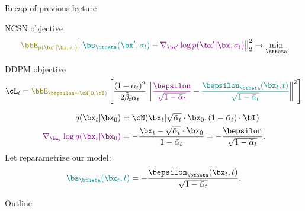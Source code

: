 \begin{frame}{Recap of previous lecture}
	\begin{block}{NCSN objective}
		\vspace{-0.2cm}
		\[
			{\color{olive}\bbE_{p(\bx' | \bx, \sigma_l)}}\bigl\| {\color{teal}\bs_{\btheta}(\bx', \sigma_l)} - {\color{violet}\nabla_{\bx'} \log p(\bx' | \bx, \sigma_l)} \bigr\|^2_2 \rightarrow \min_{\btheta}
		\]
	\end{block}
	\vspace{-0.3cm}
	\begin{block}{DDPM objective}
		\vspace{-0.2cm}
		\[
			\cL_t = {\color{olive}\bbE_{\bepsilon \sim \cN(0, \bI)}} \left[ \frac{(1 - \alpha_t)^2}{2\tilde{\beta}_t \alpha_t} \left\| {\color{violet}\frac{\bepsilon}{\sqrt{1 - \bar{\alpha}_t}}} - {\color{teal}\frac{\bepsilon_{\btheta}(\bx_t, t)}{\sqrt{1 - \bar{\alpha}_t}}}\right\|^2 \right]
		\]
		\vspace{-0.7cm}
	\end{block}
	\begin{align*}
		q(\bx_t | \bx_0) &= \cN(\bx_t | \sqrt{\bar{\alpha}_t} \cdot \bx_0, (1 - \bar{\alpha}_t) \cdot \bI) \\
		{\color{violet}\nabla_{\bx_t} \log q(\bx_t | \bx_0)} &= - \frac{\bx_t - \sqrt{\bar{\alpha}_t} \cdot \bx_0}{1 - \bar{\alpha}_t} = - \frac{\bepsilon}{\sqrt{1 - \bar{\alpha}_t}}.
	\end{align*}
		Let reparametrize our model: 
		\vspace{-0.2cm}
		\[
			{\color{teal}\bs_{\btheta}(\bx_t, t)} = - \frac{\bepsilon_{\btheta}(\bx_t, t)}{\sqrt{1 - \bar{\alpha}_t}}.
		\]
	\end{frame}
\begin{frame}{Outline}
	\tableofcontents
\end{frame}

